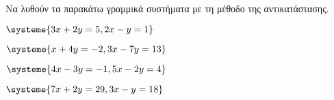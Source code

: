 Να λυθούν τα παρακάτω γραμμικά συστήματα με τη μέθοδο της αντικατάστασης.
\begin{multicols}{2}
\begin{rlist}[leftmargin=5mm]
\item $ \systeme{3x+2y=5,2x-y=1} $
\item $ \systeme{x+4y=-2,3x-7y=13} $
\item $ \systeme{4x-3y=-1,5x-2y=4} $
\item $ \systeme{7x+2y=29,3x-y=18} $
\end{rlist}
\end{multicols}
